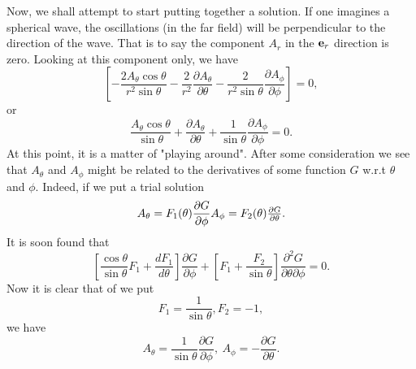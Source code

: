 Now, we shall attempt to start putting together a solution. If one
 imagines a spherical wave, the oscillations (in the far field) will be
perpendicular to the direction of the wave. That is to say the component
  $A_r$ in the ${\bf e}_r$ direction is zero. Looking at this 
component only, we have
\begin{equation}
\left \lbrack
- \frac{ 2 A_\theta \cos \theta}{r^2 \sin \theta}
- \frac{2}{r^2} \frac{\partial A_\theta}{\partial \theta}
-\frac{2}{r^2 \sin \theta} \frac{\partial A_\phi}{\partial \phi}
\right \rbrack=0, 
\end{equation}
or
\begin{equation}
 \frac{  A_\theta \cos \theta}{ \sin \theta}
+ \frac{\partial A_\theta}{\partial \theta}
+\frac{1}{\sin \theta} \frac{\partial A_\phi}{\partial \phi}=0.
\end{equation}
At this point, it is a matter of "playing around". After some consideration
we see that $A_\theta$ and $A_\phi$ might be related to the derivatives
of some function $G$ w.r.t $\theta$ and $\phi$. Indeed, if we put a
trial solution
\begin{equation}
A_\theta=F_1(\theta)\frac{\partial G}{\partial \phi}
$$     $$
A_\phi=F_2(\theta)\frac{\partial G}{\partial \theta}.
\end{equation}
It is soon found that
\begin{equation}
\left \lbrack
\frac{\cos \theta}{\sin \theta} F_1
+ \frac{d F_1}{d \theta} 
\right \rbrack
\frac{\partial G}{\partial \phi}
+\left \lbrack
F_1 + \frac{F_2}{\sin \theta} 
\right \rbrack
\frac{\partial^2 G}{\partial \theta \partial \phi}=0.
\end{equation}
Now it is clear that of we put
\begin{equation}
F_1=\frac{1}{\sin \theta}, F_2=-1,
\end{equation}
 we have 
\begin{equation}
A_\theta=\frac{1}{\sin \theta} \frac{\partial G}{\partial \phi}, \>
A_\phi=-\frac{\partial G}{\partial \theta}.
\end{equation}

